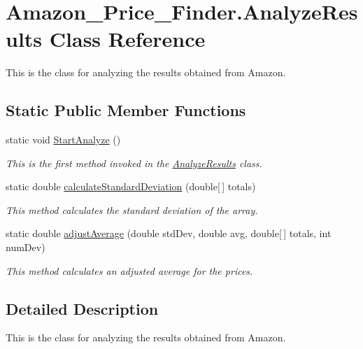 \hypertarget{class_amazon___price___finder_1_1_analyze_results}{\section{Amazon\-\_\-\-Price\-\_\-\-Finder.\-Analyze\-Results Class Reference}
\label{class_amazon___price___finder_1_1_analyze_results}
}


This is the class for analyzing the results obtained from Amazon.  


\subsection*{Static Public Member Functions}
\begin{DoxyCompactItemize}
\item 
static void \hyperlink{class_amazon___price___finder_1_1_analyze_results_a9f06eafd05cf665670bf6acc88e5a1ca}{Start\-Analyze} ()
\begin{DoxyCompactList}\small\item\em This is the first method invoked in the \hyperlink{class_amazon___price___finder_1_1_analyze_results}{Analyze\-Results} class. \end{DoxyCompactList}\item 
static double \hyperlink{class_amazon___price___finder_1_1_analyze_results_a3849c1953175489f3291237f18709b41}{calculate\-Standard\-Deviation} (double\mbox{[}$\,$\mbox{]} totals)
\begin{DoxyCompactList}\small\item\em This method calculates the standard deviation of the array. \end{DoxyCompactList}\item 
static double \hyperlink{class_amazon___price___finder_1_1_analyze_results_ac3cd30780c90de34909ab164646ee3da}{adjust\-Average} (double std\-Dev, double avg, double\mbox{[}$\,$\mbox{]} totals, int num\-Dev)
\begin{DoxyCompactList}\small\item\em This method calculates an adjusted average for the prices. \end{DoxyCompactList}\end{DoxyCompactItemize}


\subsection{Detailed Description}
This is the class for analyzing the results obtained from Amazon. 

